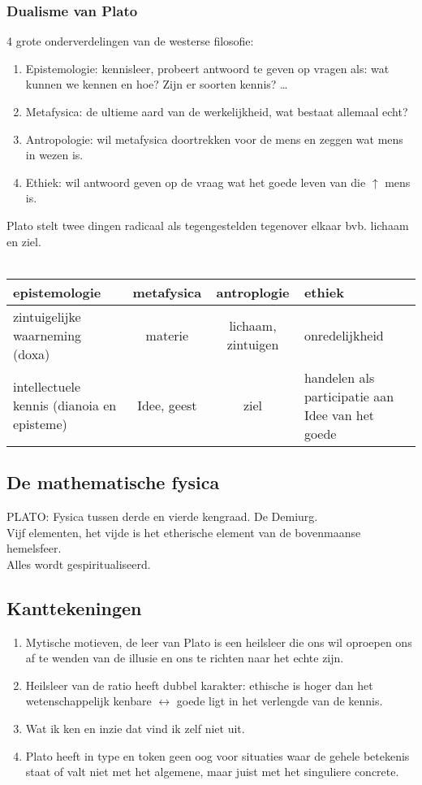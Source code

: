 \subsubsection*{Dualisme van Plato}
4 grote onderverdelingen van de westerse filosofie:
\begin{enumerate}
\item Epistemologie: kennisleer, probeert antwoord te geven op vragen als: wat kunnen we kennen en hoe? Zijn er soorten kennis? \dots
\item Metafysica: de ultieme aard van de werkelijkheid, wat bestaat allemaal echt?
\item Antropologie: wil metafysica doortrekken voor de mens en zeggen wat mens in wezen is.
\item Ethiek: wil antwoord geven op de vraag wat het goede leven van die $\uparrow$ mens is.
\end{enumerate}
Plato stelt twee dingen radicaal als tegengestelden tegenover elkaar bvb. lichaam en ziel.
\\
\\
\begin{tabular}{p{4cm} c c p{5cm}}
	\hline
	\hline
	epistemologie & metafysica & antroplogie & ethiek \\
	\hline
	\hline
	zintuigelijke waarneming (doxa) & materie & lichaam, zintuigen & onredelijkheid \\
	\hline
	intellectuele kennis (dianoia en episteme) & Idee, geest & ziel & handelen als participatie aan Idee van het goede \\
	\hline
	\hline
\end{tabular}
\subsection{De mathematische fysica}
PLATO: 
Fysica tussen derde en vierde kengraad. 
De Demiurg.
\\
Vijf elementen, het vijde is het etherische element van de bovenmaanse hemelsfeer.
\\
Alles wordt gespiritualiseerd.
\subsection{Kanttekeningen}
\begin{enumerate}
\item Mytische motieven, de leer van Plato is een heilsleer die ons wil oproepen ons af te wenden van de illusie en ons te richten naar het echte zijn.
\item Heilsleer van de ratio heeft dubbel karakter: ethische is hoger dan het wetenschappelijk kenbare $\leftrightarrow$ goede ligt in het verlengde van de kennis.
\item Wat ik ken en inzie dat vind ik zelf niet uit.
\item Plato heeft in type en token geen oog voor situaties waar de gehele betekenis staat of valt niet met het algemene, maar juist met het singuliere concrete.
\end{enumerate}
